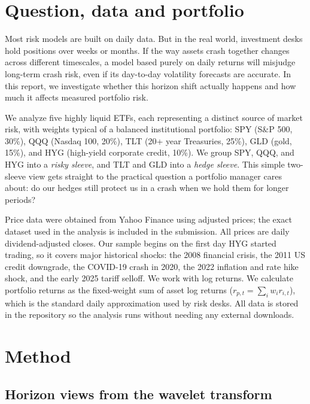 \documentclass[11pt,a4paper]{article}
\begin{document}
\section{Question, data and portfolio}
\label{sec:data}

Most risk models are built on daily data. But in the real world, investment desks hold positions over weeks or months. If the way assets crash together changes across different timescales, a model based purely on daily returns will misjudge long-term crash risk, even if its day-to-day volatility forecasts are accurate. In this report, we investigate whether this horizon shift actually happens and how much it affects measured portfolio risk.

We analyze five highly liquid ETFs, each representing a distinct source of market risk, with weights typical of a balanced institutional portfolio: SPY (S\&P 500, 30\%), QQQ (Nasdaq 100, 20\%), TLT (20+ year Treasuries, 25\%), GLD (gold, 15\%), and HYG (high-yield corporate credit, 10\%). We group SPY, QQQ, and HYG into a \emph{risky sleeve}, and TLT and GLD into a \emph{hedge sleeve}. This simple two-sleeve view gets straight to the practical question a portfolio manager cares about: do our hedges still protect us in a crash when we hold them for longer periods?

Price data were obtained from Yahoo Finance using adjusted prices; the exact dataset used in the analysis is included in the submission. All prices are daily dividend-adjusted closes. Our sample begins on the first day HYG started trading, so it covers major historical shocks: the 2008 financial crisis, the 2011 US credit downgrade, the COVID-19 crash in 2020, the 2022 inflation and rate hike shock, and the early 2025 tariff selloff. We work with log returns. We calculate portfolio returns as the fixed-weight sum of asset log returns ($r_{p,t} = \sum_i w_i r_{i,t}$), which is the standard daily approximation used by risk desks. All data is stored in the repository so the analysis runs without needing any external downloads.

\section{Method}
\label{sec:method}

\subsection{Horizon views from the wavelet transform}
\label{sec:views}
\end{document}
